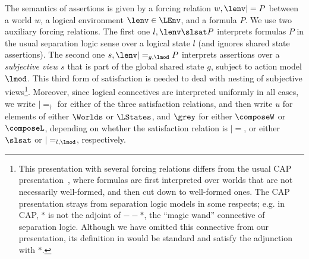 The semantics of \colosl assertions is given by a forcing relation $w,\lenv|= P$ between a world $w$, a logical environment $\lenv\in\LEnv$, and a formula $P$. We use two auxiliary forcing relations. The first one $l,\lenv\slsat P$ interprets formulas $P$ in the usual separation
logic sense over a logical state $l$ (and ignores shared state assertions). The second one $s,\lenv|=_{g,\lmod} P$ interprets assertions over a \emph{subjective view} $s$ that is part of the global shared state $g$, subject to action model $\lmod$. This third form of satisfaction is needed to deal with nesting of subjective views\footnote{This presentation with several forcing relations differs from the usual CAP presentation~\cite{cap-ecoop10}, where formulas are first interpreted over worlds that are not necessarily well-formed, and then cut down to well-formed ones. The CAP presentation strays from separation logic models in some respects; e.g. in CAP, $*$ is not the adjoint of $--*$, the ``magic wand'' connective of separation logic. Although we have omitted this connective from our presentation, its definition in \colosl would be standard and satisfy the adjunction with $*$.}.
%
Moreover, since logical connectives are interpreted uniformly in all cases, we write $|=_\dagger$ for either of the three satisfaction relations, and then write $u$ for elements of either $\Worlds$ or $\LStates$, and $\grey$ for either $\composeW$ or $\composeL$, depending on whether the satisfaction relation is $|=$, or either $\slsat$ or $|=_{l,\lmod}$, respectively.
%
%
